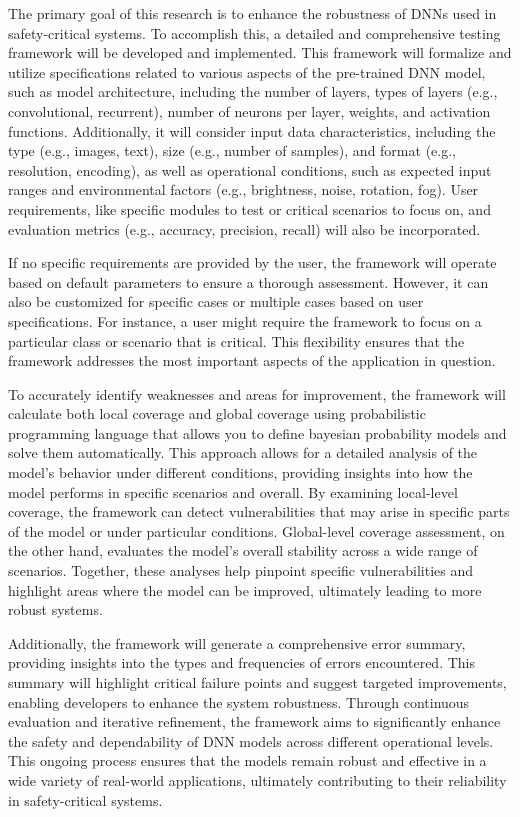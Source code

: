  The primary goal of this research is to enhance the robustness of DNNs used in safety-critical systems. To accomplish this, a detailed and comprehensive testing framework will be developed and implemented. This framework will formalize and utilize specifications related to various aspects of the pre-trained DNN model, such as model architecture, including the number of layers, types of layers (e.g., convolutional, recurrent), number of neurons per layer, weights, and activation functions. Additionally, it will consider input data characteristics, including the type (e.g., images, text), size (e.g., number of samples), and format (e.g., resolution, encoding), as well as operational conditions, such as expected input ranges and environmental factors (e.g., brightness, noise, rotation, fog). User requirements, like specific modules to test or critical scenarios to focus on, and evaluation metrics (e.g., accuracy, precision, recall) will also be incorporated.

If no specific requirements are provided by the user, the framework will operate based on default parameters to ensure a thorough assessment. However, it can also be customized for specific cases or multiple cases based on user specifications. For instance, a user might require the framework to focus on a particular class or scenario that is critical. This flexibility ensures that the framework addresses the most important aspects of the application in question.

To accurately identify weaknesses and areas for improvement, the framework will calculate both local coverage and global coverage using probabilistic programming language that allows you to define bayesian probability models and solve them automatically. This approach allows for a detailed analysis of the model's behavior under different conditions, providing insights into how the model performs in specific scenarios and overall. By examining local-level coverage, the framework can detect vulnerabilities that may arise in specific parts of the model or under particular conditions. Global-level coverage assessment, on the other hand, evaluates the model's overall stability across a wide range of scenarios. Together, these analyses help pinpoint specific vulnerabilities and highlight areas where the model can be improved, ultimately leading to more robust systems.

Additionally, the framework will generate a comprehensive error summary, providing insights into the types and frequencies of errors encountered. This summary will highlight critical failure points and suggest targeted improvements, enabling developers to enhance the system robustness.
Through continuous evaluation and iterative refinement, the framework aims to significantly enhance the safety and dependability of DNN models across different operational levels. This ongoing process ensures that the models remain robust and effective in a wide variety of real-world applications, ultimately contributing to their reliability in safety-critical systems.

